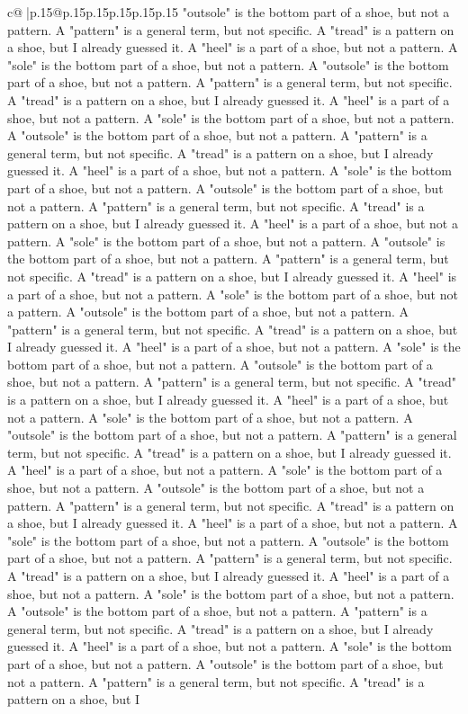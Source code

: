 \documentclass{article}
\begin{document}
{\begin{supertabular}{c@{$\;$}|p{.15\linewidth}@{}p{.15\linewidth}p{.15\linewidth}p{.15\linewidth}p{.15\linewidth}p{.15\linewidth}}
{{{"outsole" is the bottom part of a shoe, but not a pattern. A "pattern" is a general term, but not specific. A "tread" is a pattern on a shoe, but I already guessed it. A "heel" is a part of a shoe, but not a pattern. A "sole" is the bottom part of a shoe, but not a pattern. A "outsole" is the bottom part of a shoe, but not a pattern. A "pattern" is a general term, but not specific. A "tread" is a pattern on a shoe, but I already guessed it. A "heel" is a part of a shoe, but not a pattern. A "sole" is the bottom part of a shoe, but not a pattern. A "outsole" is the bottom part of a shoe, but not a pattern. A "pattern" is a general term, but not specific. A "tread" is a pattern on a shoe, but I already guessed it. A "heel" is a part of a shoe, but not a pattern. A "sole" is the bottom part of a shoe, but not a pattern. A "outsole" is the bottom part of a shoe, but not a pattern. A "pattern" is a general term, but not specific. A "tread" is a pattern on a shoe, but I already guessed it. A "heel" is a part of a shoe, but not a pattern. A "sole" is the bottom part of a shoe, but not a pattern. A "outsole" is the bottom part of a shoe, but not a pattern. A "pattern" is a general term, but not specific. A "tread" is a pattern on a shoe, but I already guessed it. A "heel" is a part of a shoe, but not a pattern. A "sole" is the bottom part of a shoe, but not a pattern. A "outsole" is the bottom part of a shoe, but not a pattern. A "pattern" is a general term, but not specific. A "tread" is a pattern on a shoe, but I already guessed it. A "heel" is a part of a shoe, but not a pattern. A "sole" is the bottom part of a shoe, but not a pattern. A "outsole" is the bottom part of a shoe, but not a pattern. A "pattern" is a general term, but not specific. A "tread" is a pattern on a shoe, but I already guessed it. A "heel" is a part of a shoe, but not a pattern. A "sole" is the bottom part of a shoe, but not a pattern. A "outsole" is the bottom part of a shoe, but not a pattern. A "pattern" is a general term, but not specific. A "tread" is a pattern on a shoe, but I already guessed it. A "heel" is a part of a shoe, but not a pattern. A "sole" is the bottom part of a shoe, but not a pattern. A "outsole" is the bottom part of a shoe, but not a pattern. A "pattern" is a general term, but not specific. A "tread" is a pattern on a shoe, but I already guessed it. A "heel" is a part of a shoe, but not a pattern. A "sole" is the bottom part of a shoe, but not a pattern. A "outsole" is the bottom part of a shoe, but not a pattern. A "pattern" is a general term, but not specific. A "tread" is a pattern on a shoe, but I already guessed it. A "heel" is a part of a shoe, but not a pattern. A "sole" is the bottom part of a shoe, but not a pattern. A "outsole" is the bottom part of a shoe, but not a pattern. A "pattern" is a general term, but not specific. A "tread" is a pattern on a shoe, but I already guessed it. A "heel" is a part of a shoe, but not a pattern. A "sole" is the bottom part of a shoe, but not a pattern. A "outsole" is the bottom part of a shoe, but not a pattern. A "pattern" is a general term, but not specific. A "tread" is a pattern on a shoe, but I }}}
\end{supertabular}}
\end{document}
